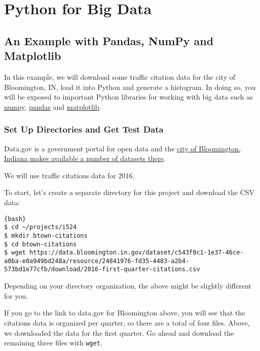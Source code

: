 \section{Python for Big Data}\label{python-for-big-data}

\subsection{An Example with Pandas, NumPy and Matplotlib}\label{an-example-with-pandas-numpy-and-matplotlib}

In this example, we will download some traffic citation data for the
city of Bloomington, IN, load it into Python and generate a histogram.
In doing so, you will be exposed to important Python libraries for
working with big data such as \href{www.numpy.org}{numpy},
\href{pandas.pydata.org}{pandas} and \href{matplotlib.org}{matplotlib}.

\subsubsection{Set Up Directories and Get Test
Data}\label{set-up-directories-and-get-test-data}

Data.gov is a government portal for open data and the
\href{https://catalog.data.gov/dataset?organization_type=City+Government\&organization=city-of-bloomington\&_organization_limit=0}{city
  of Bloomington, Indiana makes available a number of datasets there}.

We will use traffic citations data for 2016.

To start, let's create a separate directory for this project and
download the CSV data:

\begin{lstlisting}{bash}
$ cd ~/projects/i524
$ mkdir btown-citations
$ cd btown-citations
$ wget https://data.bloomington.in.gov/dataset/c543f0c1-1e37-46ce-a0ba-e0a949bd248a/resource/24841976-fd35-4483-a2b4-573bd1e77cfb/download/2016-first-quarter-citations.csv
\end{lstlisting}

Depending on your directory organization, the above might be slightly
different for you.

If you go to the link to data.gov for Bloomington above, you will see
that the citations data is organized per quarter, so there are a total
of four files. Above, we downloaded the data for the first quarter. Go
ahead and download the remaining three files with \texttt{wget}.

